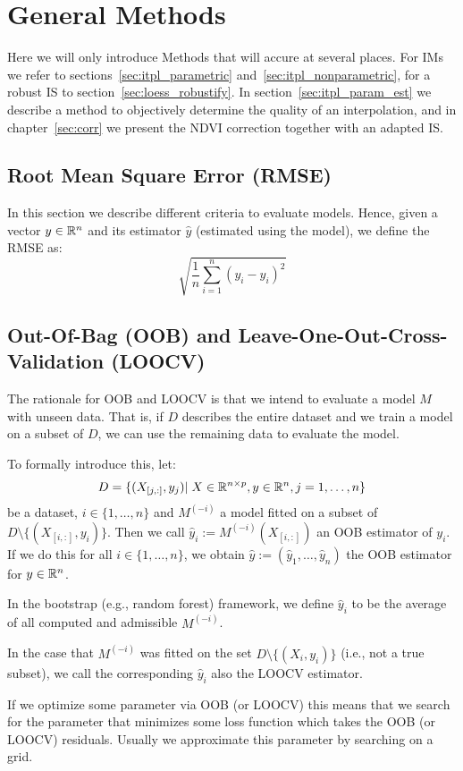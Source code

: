 \section{General Methods}{\label{sec:general_methods}
	Here we will only introduce Methods that will accure at several places. For {{IM}}s we refer to sections~\ref{sec:itpl_parametric} and~\ref{sec:itpl_nonparametric}, for a robust {{IS}} to section~\ref{sec:loess_robustify}. In section~\ref{sec:itpl_param_est} we describe a method to objectively determine the quality of an interpolation, and in chapter~\ref{sec:corr} we present the NDVI correction together with an adapted {{IS}}.


	\subsection{Root Mean Square Error (RMSE)}
		In this section we describe different criteria to evaluate models. Hence, given a vector $y\in \mathbb{R}^n$ and its estimator $\hat y$ (estimated using the model), we define the RMSE as:
		\begin{equation}
			\label{eq:rmse}
			 \sqrt{\frac{1}{n}\sum_{i=1}^n (y_i - \hat y_i)^2}
		\end{equation}
		
		\subsection{Out-Of-Bag ({OOB}) and Leave-One-Out-Cross-Validation ({LOOCV})}{ \label{sec:OOB_LOOCV}
		The rationale for OOB and LOOCV is that we intend to evaluate a model $M$ with unseen data. That is, if $D$ describes the entire dataset and we train a model on a subset of $D$, we can use the remaining data to evaluate the model. 
		
		To formally introduce this, let:
		$$
			D=\{(X_{[j,:]},y_j)|\; X\in\mathbb{R}^{n\times p}, y\in \mathbb{R}^n, j=1,\dots,n\}
		$$
		be a dataset, $i\in \{1,\dots,n\}$ and $M^{(-i)}$ a model fitted on a subset of $D\setminus\{(X_{[i,:]},y_i)\}$. Then we call $\hat y_i:= M^{(-i)}(X_{[i,:]})$ an {OOB} estimator of $y_i$. If we do this for all $i\in\{1,\dots,n\}$, we obtain $\hat y := \left(\hat y_1,\dots,\hat y_n\right)$ the OOB estimator for $y\in \mathbb{R}^n$.

		In the bootstrap (e.g., random forest) framework, we define $\hat y_i$ to be the average of all computed and admissible $M^{(-i)}$. 
		
		In the case that $M^{(-i)}$ was fitted on the set $D\setminus\{(X_i,y_i)\}$ (i.e., not a true subset), we call the corresponding $\hat y_i$ also the LOOCV estimator.	

		If we optimize some parameter via OOB (or LOOCV) this means that we search for the parameter that minimizes some loss function which takes the OOB (or LOOCV) residuals. Usually we approximate this parameter by searching on a grid. 
	}

}
